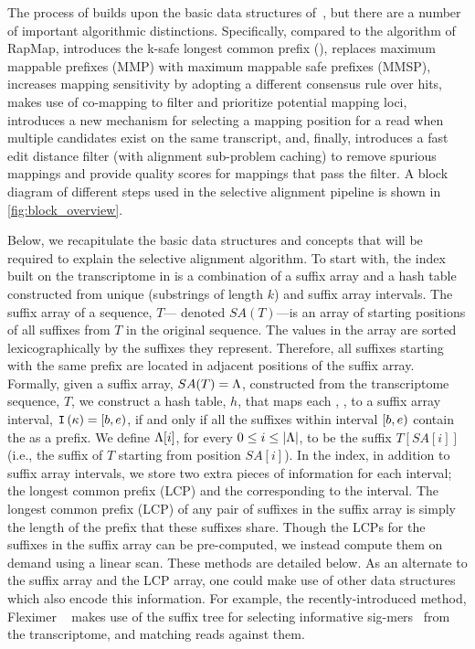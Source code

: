 The process of \sla builds upon the basic data structures of~\citet{Srivastava2016rapmap}, 
but there are a number of important algorithmic distinctions. Specifically, compared to 
the algorithm of RapMap, \sla introduces the k-safe longest common prefix (\kslcp), 
replaces maximum mappable prefixes (MMP) with maximum mappable safe prefixes (MMSP), 
increases mapping sensitivity by adopting a different consensus rule over hits, makes 
use of co-mapping to filter and prioritize potential mapping loci, introduces a new 
mechanism for selecting a mapping position for a read when multiple candidates exist on 
the same transcript, and, finally, introduces a fast edit distance filter (with alignment 
sub-problem caching) to remove spurious mappings and provide quality scores for 
mappings that pass the filter. A block diagram of different steps used in the selective 
alignment pipeline is shown in \ref{fig:block_overview}.

Below, we recapitulate the basic data structures and concepts that will be required to 
explain the selective alignment algorithm. To start with, the index built on the 
transcriptome in \sla is a combination of a suffix array and a hash table constructed 
from unique \kmers (substrings of length $k$) and suffix array intervals. The suffix 
array of a sequence, $T$--- denoted $SA(T)$---is an array of starting positions of all 
suffixes from $T$ in the original sequence. The values in the array are sorted 
lexicographically by the suffixes they represent. Therefore, all suffixes starting 
with the same prefix are located in adjacent positions of the suffix array. Formally, 
given a suffix array, $SA(T)=\Lambda$, constructed from the transcriptome sequence, 
$T$, we construct a hash table, $h$, that maps each \kmer, \samplekmer, to a suffix array 
interval, $\texttt{I}\left({\kappa}\right) = \left[b,e\right)$, if and only if all the suffixes within 
interval $\left[b,e\right)$ contain the \kmer \samplekmer as a prefix. We define 
$\Lambda[i]$, for every $0\le i \le |\Lambda|$, to be the suffix $T[SA[i]]$ 
(i.e., the suffix of $T$ starting from position $SA[i]$). In the \sla index, in addition to 
suffix array intervals, we store two extra pieces of information for each interval; the 
longest common prefix (LCP) and the \kslcp corresponding to the interval. The longest 
common prefix (LCP) of any pair of suffixes in the suffix array is simply the length of 
the prefix that these suffixes share. Though the LCPs for the suffixes in the suffix array 
can be pre-computed, we instead compute them on demand using a linear scan. These methods 
are detailed below. As an alternate to the suffix array and the LCP array, one could make 
use of other data structures which also encode this information. For example, the 
recently-introduced method, Fleximer ~\citep{ju2017fleximer} makes use of the suffix 
tree for selecting informative sig-mers~\citep{zhang2014rna} from the transcriptome, and 
matching reads against them.

